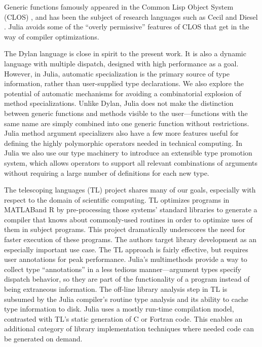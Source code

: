 \documentclass[9pt]{sigplanconf}
\newcommand{\Matlab}{MATLAB\textsuperscript{\tiny\textregistered}}
\begin{document}
Generic functions famously appeared in the Common Lisp
Object System (CLOS) \cite{closoverview} \cite{closspec}, and has been the
subject of research languages such as Cecil \cite{cecil} and
Diesel \cite{dieselspec}.
Julia avoids some of the ``overly permissive'' features of
CLOS \cite{clostrophobia} that get in the way of compiler optimizations.

The Dylan language \cite{dylanlang} is close in spirit to
the present work. It is also a dynamic language with multiple dispatch,
designed with high performance as a goal. However, in Julia,
automatic specialization is the primary source of type information, rather
than user-supplied type declarations. We also explore the potential of
automatic mechanisms for avoiding a combinatorial explosion of method
specializations.
Unlike Dylan, Julia does not make the distinction between generic functions
and methods visible to the user---functions with the same name are simply
combined into one generic function without restrictions.
Julia method argument specializers also have a few more features
useful for defining the highly polymorphic operators needed in technical
computing. In Julia we also use our type machinery to introduce an
extensible type promotion system, which allows operators to support all
relevant combinations of arguments without requiring a large number
of definitions for each new type.

The telescoping languages (TL) project \cite{telescoping} shares many of our
goals, especially with respect to the domain of scientific computing.
TL optimizes programs in \Matlab and
R by pre-processing those systems' standard libraries to
generate a compiler that knows about commonly-used routines in order
to optimize uses of them in subject programs. This project dramatically
underscores the need for faster execution of these programs. The authors
target library development as an especially important use case. The
TL approach is fairly effective, but requires user
annotations for peak performance. Julia's multimethods provide a way to
collect type ``annotations'' in a less tedious manner---argument types
specify dispatch behavior, so they are part of the functionality of a program
instead of being extraneous information. The off-line library analysis step in
TL is subsumed by the Julia compiler's routine
type analysis and its ability to cache type information to disk. Julia
uses a mostly run-time compilation model, contrasted with TL's static
generation of C or Fortran code. This enables an additional category of
library implementation techniques where needed code can be generated on demand.
\end{document}
